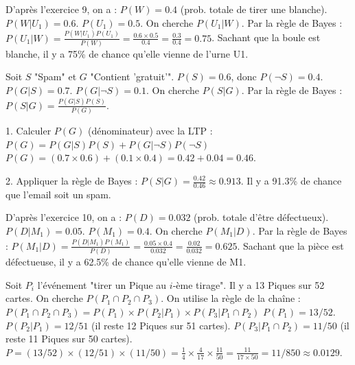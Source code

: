 \begin{correctionbox}
D'après l'exercice 9, on a :
$P(W) = 0.4$ (prob. totale de tirer une blanche).
$P(W|U_1) = 0.6$.
$P(U_1) = 0.5$.
On cherche $P(U_1|W)$. Par la règle de Bayes :
$P(U_1|W) = \frac{P(W|U_1)P(U_1)}{P(W)} = \frac{0.6 \times 0.5}{0.4} = \frac{0.3}{0.4} = 0.75$.
Sachant que la boule est blanche, il y a 75\% de chance qu'elle vienne de l'urne U1.
\end{correctionbox}

\begin{correctionbox}
Soit $S$ "Spam" et $G$ "Contient 'gratuit'".
$P(S) = 0.6$, donc $P(\neg S) = 0.4$.
$P(G|S) = 0.7$.
$P(G|\neg S) = 0.1$.
On cherche $P(S|G)$. Par la règle de Bayes : $P(S|G) = \frac{P(G|S)P(S)}{P(G)}$.

1.  Calculer $P(G)$ (dénominateur) avec la LTP :
    $P(G) = P(G|S)P(S) + P(G|\neg S)P(\neg S)$
    $P(G) = (0.7 \times 0.6) + (0.1 \times 0.4) = 0.42 + 0.04 = 0.46$.

2.  Appliquer la règle de Bayes :
    $P(S|G) = \frac{0.42}{0.46} \approx 0.913$.
    Il y a 91.3\% de chance que l'email soit un spam.
\end{correctionbox}

\begin{correctionbox}
D'après l'exercice 10, on a :
$P(D) = 0.032$ (prob. totale d'être défectueux).
$P(D|M_1) = 0.05$.
$P(M_1) = 0.4$.
On cherche $P(M_1|D)$. Par la règle de Bayes :
$P(M_1|D) = \frac{P(D|M_1)P(M_1)}{P(D)} = \frac{0.05 \times 0.4}{0.032} = \frac{0.02}{0.032} = 0.625$.
Sachant que la pièce est défectueuse, il y a 62.5\% de chance qu'elle vienne de M1.
\end{correctionbox}


\begin{correctionbox}
Soit $P_i$ l'événement "tirer un Pique au $i$-ème tirage". Il y a 13 Piques sur 52 cartes.
On cherche $P(P_1 \cap P_2 \cap P_3)$. On utilise la règle de la chaîne :
$P(P_1 \cap P_2 \cap P_3) = P(P_1) \times P(P_2|P_1) \times P(P_3|P_1 \cap P_2)$
$P(P_1) = 13/52$.
$P(P_2|P_1) = 12/51$ (il reste 12 Piques sur 51 cartes).
$P(P_3|P_1 \cap P_2) = 11/50$ (il reste 11 Piques sur 50 cartes).
$P = (13/52) \times (12/51) \times (11/50) = \frac{1}{4} \times \frac{4}{17} \times \frac{11}{50} = \frac{11}{17 \times 50} = 11/850 \approx 0.0129$.
\end{correctionbox}

